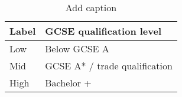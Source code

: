 \begin{table}[htbp]
	\centering
	\caption{Add caption}
	\begin{tabular}{ll}
		\toprule
		\textbf{ Label } & \textbf{ GCSE qualification level } \\
		\midrule
		Low   & Below GCSE A \\
		Mid   & GCSE A* / trade qualification \\
		High  & Bachelor +  \\
		\bottomrule
		\bottomrule
	\end{tabular}%
	\label{tab:addlabel}%
\end{table}%
